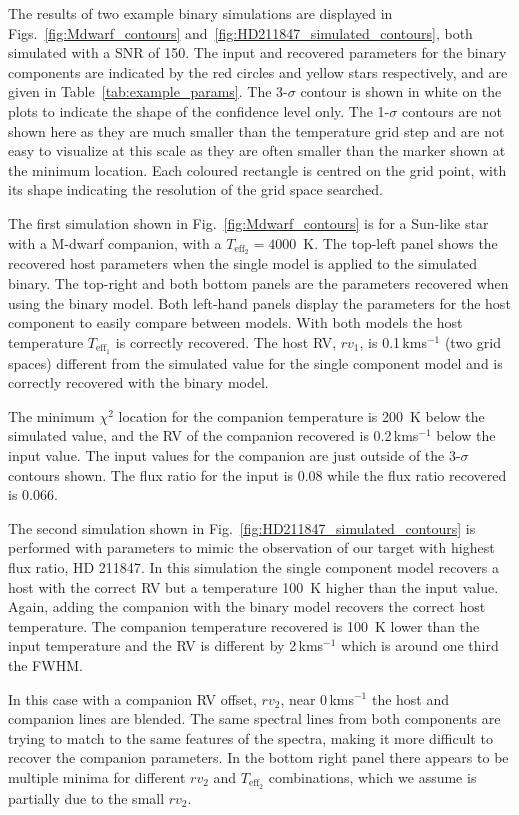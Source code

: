 \documentclass[fleqn,usenatbib]{mnras}
\newcommand{\kmps}{\,kms\(^{-1}\)}	%
\begin{document}
The results of two example binary simulations are displayed in Figs.~\ref{fig:Mdwarf_contours} and~\ref{fig:HD211847_simulated_contours}, both simulated with a SNR of 150. The input and recovered parameters for the binary components are indicated by the red circles and yellow stars respectively, and are given in Table~\ref{tab:example_params}.
The 3-\(\sigma\) contour is shown in white on the plots to indicate the shape of the confidence level only. The 1-\(\sigma\) contours are not shown here as they are much smaller than the temperature grid step and are not easy to visualize at this scale as they are often smaller than the marker shown at the minimum location. Each coloured rectangle is centred on the grid point, with its shape indicating the resolution of the grid space searched.

The first simulation shown in Fig.~\ref{fig:Mdwarf_contours} is for a Sun-like star with a M-dwarf companion, with a \(T_{\textrm{eff}_2} =4000\)~K. The top-left panel shows the recovered host parameters when the single model is applied to the simulated binary. The top-right and both bottom panels are the parameters recovered when using the binary model. Both left-hand panels display the parameters for the host component to easily compare between models. With both models the host temperature \(T_{\textrm{eff}_1}\) is correctly recovered. The host RV, \({rv}_1\), is 0.1\kmps{} (two grid spaces) different from the simulated value for the single component model and is correctly recovered with the binary model.

The minimum \(\chi^2\) location for the companion temperature is 200~K below the simulated value, and the RV of the companion recovered is 0.2\kmps{} below the input value. The input values for the companion are just outside of the 3-\(\sigma\) contours shown. The flux ratio for the input is 0.08 while the flux ratio recovered is 0.066.

The second simulation shown in Fig.~\ref{fig:HD211847_simulated_contours} is performed with parameters to mimic the observation of our target with highest flux ratio, {HD 211847}. In this simulation the single component model recovers a host with the correct RV but a temperature 100~K higher than the input value. Again, adding the companion with the binary model recovers the correct host temperature. The companion temperature recovered is 100~K lower than the input temperature and the RV is different by 2\kmps{} which is around one third the FWHM.

In this case with a companion RV offset, \({rv}_2\), near 0\kmps{} the host and companion lines are blended. The same spectral lines from both components are trying to match to the same features of the spectra, making it more difficult to recover the companion parameters. In the bottom right panel there appears to be multiple minima for different \({rv}_2\) and \(T_{\textrm{eff}_2}\) combinations, which we assume is partially due to the small \({rv}_2\).
\end{document}
